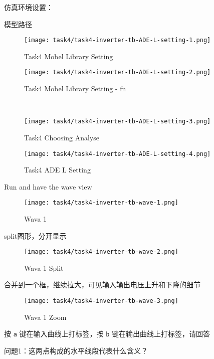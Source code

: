 \documentclass{theme-2614084}
\begin{document}
仿真环境设置：

模型路径

\begin{figure}[htbp]
  \centering\begin{minipage}[t]{0.48\textwidth}
    \centering\texttt{[image: task4/task4-inverter-tb-ADE-L-setting-1.png]}
    \caption{Task4 Mobel Library Setting}
  \end{minipage}
  \centering\begin{minipage}[t]{0.48\textwidth}
    \centering\texttt{[image: task4/task4-inverter-tb-ADE-L-setting-2.png]}
    \caption{Task4 Mobel Library Setting - fn}
  \end{minipage}
  \\
  \centering\begin{minipage}[t]{0.48\textwidth}
    \centering\texttt{[image: task4/task4-inverter-tb-ADE-L-setting-3.png]}
    \caption{Task4 Choosing Analyse}
  \end{minipage}
  \centering\begin{minipage}[t]{0.48\textwidth}
    \centering\texttt{[image: task4/task4-inverter-tb-ADE-L-setting-4.png]}
    \caption{Task4 ADE L Setting}
  \end{minipage}
\end{figure}

Run and have the wave view

\begin{figure}[H]
  \centering
  \texttt{[image: task4/task4-inverter-tb-wave-1.png]}
  \caption{Wava 1}
\end{figure}

split图形，分开显示

\begin{figure}[H]
  \centering
  \texttt{[image: task4/task4-inverter-tb-wave-2.png]}
  \caption{Wava 1 Split}
\end{figure}

合并到一个框，继续拉大，可见输入输出电压上升和下降的细节

\begin{figure}[H]
  \centering
  \texttt{[image: task4/task4-inverter-tb-wave-3.png]}
  \caption{Wava 1 Zoom}
\end{figure}

按 \texttt{a} 键在输入曲线上打标签，按 \texttt{b} 键在输出曲线上打标签，请回答

问题1：这两点构成的水平线段代表什么含义？
\end{document}

